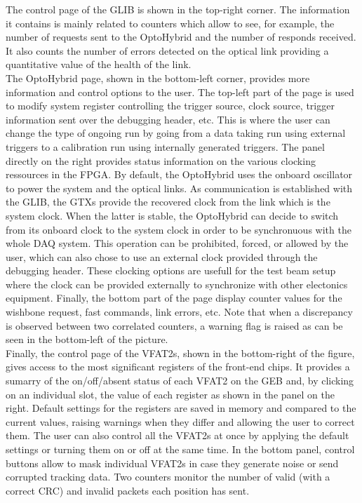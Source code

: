       The control page of the GLIB is shown in the top-right corner. The information it contains is mainly related to counters which allow to see, for example, the number of requests sent to the OptoHybrid and the number of responds received. It also counts the number of errors detected on the optical link providing a quantitative value of the health of the link. \\

      The OptoHybrid page, shown in the bottom-left corner, provides more information and control options to the user. The top-left part of the page is used to modify system register controlling the trigger source, clock source, trigger information sent over the debugging header, etc. This is where the user can change the type of ongoing run by going from a data taking run using external triggers to a calibration run using internally generated triggers. The panel directly on the right provides status information on the various clocking ressources in the FPGA. By default, the OptoHybrid uses the onboard oscillator to power the system and the optical links. As communication is established with the GLIB, the GTXs provide the recovered clock from the link which is the system clock. When the latter is stable, the OptoHybrid can decide to switch from its onboard clock to the system clock in order to be synchronuous with the whole DAQ system. This operation can be prohibited, forced, or allowed by the user, which can also chose to use an external clock provided through the debugging header. These clocking options are usefull for the test beam setup where the clock can be provided externally to synchronize with other electonics equipment. Finally, the bottom part of the page display counter values for the wishbone request, fast commands, link errors, etc. Note that when a discrepancy is observed between two correlated counters, a warning flag is raised as can be seen in the bottom-left of the picture. \\

      Finally, the control page of the VFAT2s, shown in the bottom-right of the figure, gives access to the most significant registers of the front-end chips. It provides a sumarry of the on/off/absent status of each VFAT2 on the GEB and, by clicking on an individual slot, the value of each register as shown in the panel on the right. Default settings for the registers are saved in memory and compared to the current values, raising warnings when they differ and allowing the user to correct them. The user can also control all the VFAT2s at once by applying the default settings or turning them on or off at the same time. In the bottom panel, control buttons allow to mask individual VFAT2s in case they generate noise or send corrupted tracking data. Two counters monitor the number of valid (with a correct CRC) and invalid packets each position has sent.

